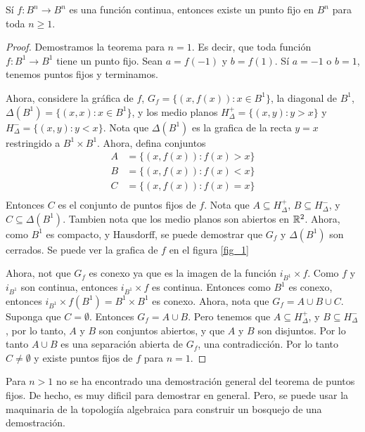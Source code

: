 \begin{theorem}\label{thm_1}
    S\'i $f:B^n \rightarrow B^n$ es una funci\'on continua, entonces existe un
    punto fijo en $B^n$ para toda $n \geq 1$.
\end{theorem}
\begin{proof}
    Demostramos la teorema para $n=1$. Es decir, que toda funci\'on  $f:B^1
    \rightarrow B^1$ tiene un punto fijo. Sean $a=f(-1)$ y $b=f(1)$. S\'i $a=-1$ o
    $b=1$, tenemos puntos fijos y terminamos.

    Ahora, considere la gr\'afica de $f$,  $G_f=\{(x,f(x)) : x \in B^1\}$, la
    diagonal de $B^1$, $\Delta(B^1)=\{(x,x) : x \in B^1\}$, y los medio planos
    $H^+_\Delta=\{(x,y) : y>x\}$ y $H^-_\Delta=\{(x,y) : y<x\}$. Nota que
    $\Delta(B^1)$ es la grafica de la recta $y=x$ restringido a $B^1 \times B^1$.
    Ahora, defina conjuntos
    \begin{align*}
        A   &=      \{(x,f(x)) : f(x)>x\} \\
        B   &=      \{(x,f(x)) : f(x)<x\} \\
        C   &=      \{(x,f(x)) : f(x)=x\} \\
    \end{align*}
    Entonces $C$ es el conjunto de puntos fijos de $f$. Nota que $A \subseteq
    H^+_\Delta$,  $B \subseteq H^-_\Delta$, y $C \subseteq \Delta(B^1)$. Tambien
    nota que los medio planos son abiertos en
    $\mathbb{R}^2$. Ahora, como  $B^1$ es compacto, y Hausdorff, se puede demostrar que
    $G_f$ y  $\Delta(B^1)$ son cerrados. Se puede ver la grafica de $f$ en el
    figura \ref{fig_1}

    Ahora, not que $G_f$ es conexo ya que es la imagen de la funci\'on $i_{B^1}
    \times f$. Como  $f$ y  $i_{B^1}$ son continua, entonces  $i_{B^1} \times f$
    es continua. Entonces como  $B^1$ es conexo, entonces $i_{B^1} \times
    f(B^1)=B^1 \times B^1$ es conexo. Ahora, nota que $G_f=A \cup B \cup C$.
    Suponga que $C=\emptyset$. Entonces  $G_f=A \cup B$. Pero tenemos que $A
    \subseteq H^+_\Delta$, y $B \subseteq H^-_\Delta$, por lo tanto, $A$ y  $B$
    son conjuntos abiertos, y que  $A$  y $B$ son disjuntos. Por lo tanto $A \cup
    B$ es una separaci\'on abierta de  $G_f$, una contradicci\'on. Por lo tanto
    $C \neq \emptyset$ y existe puntos fijos de  $f$ para $n=1$.
\end{proof}
\begin{remark}
    Para $n > 1$ no se ha encontrado una demostraci\'on general del teorema de
    puntos fijos. De hecho, es muy dificil para demostrar en general. Pero, se
    puede usar la maquinaria de la topologi\'ia algebraica para construir un
    bosquejo de una demostraci\'on.
\end{remark}

